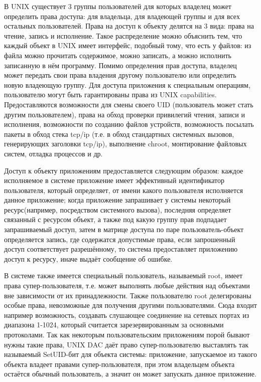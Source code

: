 В UNIX существует 3 группы пользователей для которых владелец
может определить права доступа: для владельца, для владеющей группы
и для всех остальных пользователей. Права на доступ к объекту делятся на
3 вида: права на чтение, запись и исполнение. Такое распределение можно
объяснить тем, что каждый объект в UNIX имеет интерфейс, подобный тому,
что есть у файлов: из файла можно прочитать содержимое, можно записать,
а можно исполнить записанную в нём программу. Помимо определения прав
доступа, владелец может передать свои права владения другому
пользователю или определить новую владеющую группу. Для доступа
приложения к специальным операциям, пользователю могут быть
гарантированы права из UNIX capabilities. Предоставляются возможности
для смены своего UID (пользователь может стать другим пользователем),
права на обход проверки привилегий чтения, записи и исполнения,
возможности по созданию файлов устройств, возможность посылать пакеты в
обход стека tcp/ip (т.е. в обход стандартных системных вызовов,
генерирующих заголовки tcp/ip), выполнение chroot, монтирование файловых
систем, отладка процессов и др. 

Доступ к объекту приложениям предоставляется следующим образом: каждое
исполняемое в системе приложение имеет эффективный идентификатор
пользователя, который определяет, от имени какого пользователя
исполняется данное приложение; когда приложение запрашивает у системы
некоторый ресурс(например, посредством системного вызова), последняя
определяет связанный с ресурсом объект, а также под какую группу прав
подпадает запрашиваемый доступ, затем в матрице доступа по паре
пользователь-объект определяется запись, где содержатся допустимые
права, если запрошенный доступ соответствует разрешённому, то система
предоставляет приложению доступ к ресурсу, иначе выдаёт сообщение об
ошибке.

В системе также имеется специальный пользователь, называемый root,
имеет права супер-пользователя, т.е. может выполнять любые действия над
объектами вне зависимости от их принадлежности. Также пользователю root
делегированы особые права, невозможные для получения другими
пользователями. Сюда входит например возможность, создавать слушающее
соединение на сетевых портах из диапазона 1-1024, который считается
зарезервированным за основными протоколами. Так как некоторым
пользовательским приложениям порой бывают нужны такие права, UNIX DAC
даёт право супер-пользователю выставлять так называемый SetUID-бит для
объекта системы: приложение, запускаемое из такого объекта владеет
правами супер-пользователя, при этом владельцем объекта остаётся обычный
пользователь, а значит он может запускать данное приложение.

